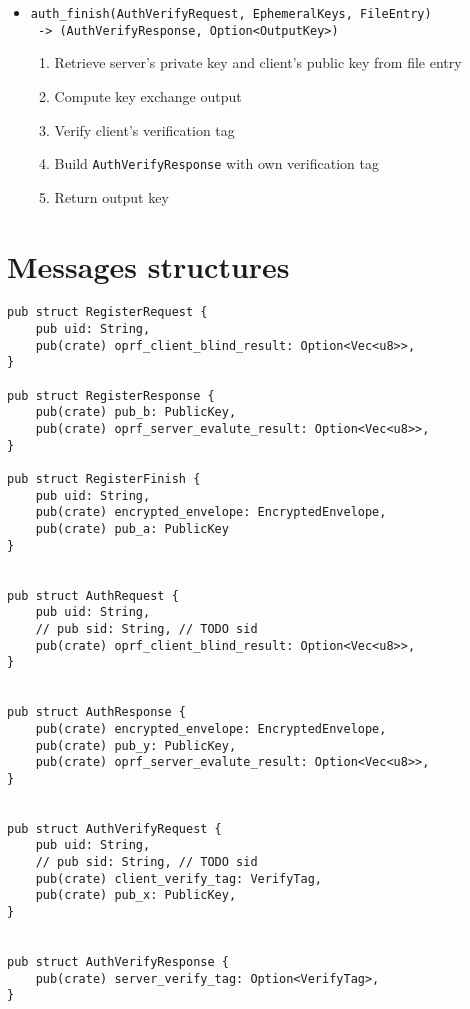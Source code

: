 \documentclass[../report.tex]{subfiles}
\begin{document}
\begin{itemize}
 \item \verb|auth_finish(AuthVerifyRequest, EphemeralKeys, FileEntry)|\\ 
       \verb| -> (AuthVerifyResponse, Option<OutputKey>)|
  \begin{enumerate}
    \item Retrieve server's private key and client's public key from file entry
    \item Compute key exchange output
    \item Verify client's verification tag
    \item Build \verb|AuthVerifyResponse| with own verification tag
    \item Return output key
  \end{enumerate}
  
\end{itemize}


\section{Messages structures}


\begin{verbatim}
pub struct RegisterRequest {
    pub uid: String,
    pub(crate) oprf_client_blind_result: Option<Vec<u8>>,
}

pub struct RegisterResponse {
    pub(crate) pub_b: PublicKey,
    pub(crate) oprf_server_evalute_result: Option<Vec<u8>>,
}

pub struct RegisterFinish {
    pub uid: String,
    pub(crate) encrypted_envelope: EncryptedEnvelope,
    pub(crate) pub_a: PublicKey
}


pub struct AuthRequest {
    pub uid: String,
    // pub sid: String, // TODO sid
    pub(crate) oprf_client_blind_result: Option<Vec<u8>>,
}


pub struct AuthResponse {
    pub(crate) encrypted_envelope: EncryptedEnvelope,
    pub(crate) pub_y: PublicKey,
    pub(crate) oprf_server_evalute_result: Option<Vec<u8>>,
}


pub struct AuthVerifyRequest {
    pub uid: String,
    // pub sid: String, // TODO sid
    pub(crate) client_verify_tag: VerifyTag,
    pub(crate) pub_x: PublicKey,
}


pub struct AuthVerifyResponse {
    pub(crate) server_verify_tag: Option<VerifyTag>,
}
\end{verbatim}
\end{document}
